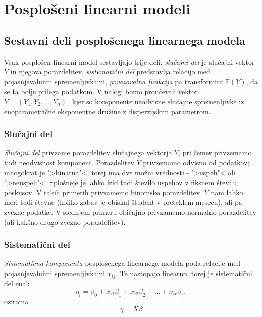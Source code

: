 \documentclass[12pt,a4paper]{amsart}
\theoremstyle{definition} %
\theoremstyle{plain} %
\begin{document}
\section{Posplošeni linearni modeli}

\subsection{Sestavni deli posplošenega linearnega modela}
Vsak posplošen linearni model sestavljajo trije deli: \textit{slučajni del} je slučajni vektor $Y$ in njegova porazdelitev, 
\textit{sistematični del} predstavlja relacijo med pojasnjevalnimi spremenljivkami, \textit{povezovalna funkcija} pa transformira $\mathbb{E}(Y)$, da se ta
bolje prilega podatkom. V nalogi bomo proučevali vektor $Y = (Y_{1},Y_{2},\ldots,Y_{n}),$ kjer so komponente neodvisne slučajne spremenljivke iz enoparametrične
eksponentne družine z disperzijskim parametrom.

\subsubsection{Slučajni del}
\textit{Slučajni del} privzame porazdelitev slučajnega vektorja $Y$, pri čemer privzemamo tudi neodvisnost komponent. Porazdelitev $Y$
privzemamo odvisno od podatkov; mnogokrat je ">binarna"<, torej ima dve možni vrednosti - ">uspeh"< ali ">neuspeh"<. Splošneje je lahko izid tudi 
število uspehov v fiksnem številu poskusov. V takih primerih privzamemo binomsko porazdelitev. $Y$ nam lahko meri tudi števne (koliko zabav je obiskal študent v preteklem mesecu), 
ali pa zvezne podatke. V slednjem primeru običajno privzamemo normalno porazdelitev (ali kakšno drugo zvezno porazdelitev).
\subsubsection{Sistematični del} 
\textit{Sistematična komponenta} posplošenega linearnega modela poda relacije med pojasnjevalnimi spremenljivkami $x_{ij}$. Te nastopajo 
linearno, torej je sistematični del enak
\[
\eta_{i} = \beta_{0} + x_{i1}\beta_{1} + x_{i2}\beta_{2} + \ldots + x_{ir}\beta_{r},
\]
oziroma
\[
    \eta = X\beta
\]
\end{document}

